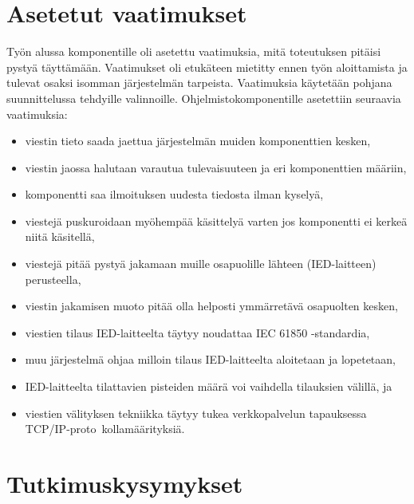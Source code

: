 

\section{Asetetut vaatimukset}
Työn alussa komponentille oli asetettu vaatimuksia, mitä toteutuksen pitäisi pystyä täyttämään. Vaatimukset oli etukäteen mietitty ennen työn aloittamista ja tulevat osaksi isomman järjestelmän tarpeista. Vaatimuksia käytetään pohjana suunnittelussa tehdyille valinnoille. Ohjelmistokomponentille asetettiin seuraavia vaatimuksia:
\begin{itemize}
	\item viestin tieto saada jaettua järjestelmän muiden komponenttien kesken,
	\item viestin jaossa halutaan varautua tulevaisuuteen ja eri komponenttien määriin,
	\item komponentti saa ilmoituksen uudesta tiedosta ilman kyselyä,
	\item viestejä puskuroidaan myöhempää käsittelyä varten jos komponentti ei kerkeä niitä käsitellä,
	\item viestejä pitää pystyä jakamaan muille osapuolille lähteen (IED-laitteen) perusteella,
	\item viestin jakamisen muoto pitää olla helposti ymmärretävä osapuolten kesken,
	\item viestien tilaus IED-laitteelta täytyy noudattaa IEC 61850 -standardia,
	\item muu järjestelmä ohjaa milloin tilaus IED-laitteelta aloitetaan ja lopetetaan,
	\item IED-laitteelta tilattavien pisteiden määrä voi vaihdella tilauksien välillä, ja
	\item viestien välityksen tekniikka täytyy tukea verkkopalvelun tapauksessa TCP/IP-pro\-to \-kol\-la\-mää\-ri\-tyk\-si\-ä.
\end{itemize}



\section{Tutkimuskysymykset}

